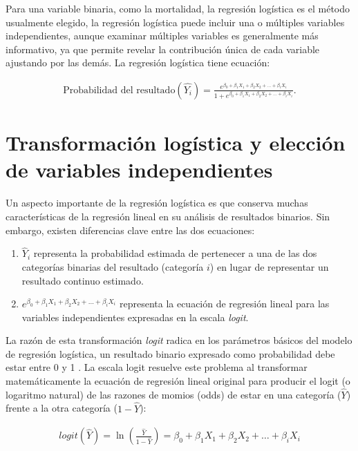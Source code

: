 \documentclass[12pt]{article}
\begin{document}
Para una variable binaria, como la mortalidad, la regresi\'on log\'istica es el m\'etodo usualmente elegido, la regresi\'on log\'istica puede incluir una o m\'ultiples variables independientes, aunque examinar m\'ultiples variables es generalmente m\'as informativo, ya que permite revelar la contribuci\'on \'unica de cada variable ajustando por las dem\'as. La regresi\'on log\'istica tiene ecuaci\'on:

\begin{eqnarray}
\textrm{Probabilidad del resultado}(\hat{Y_i}) = \frac{e^{\beta_0 + \beta_1 X_1 + \beta_2 X_2 + \ldots + \beta_i X_i}}{1 + e^{\beta_0 + \beta_1 X_1 + \beta_2 X_2 + \ldots + \beta_i X_i}}.
\end{eqnarray}


\section{Transformaci\'on log\'istica y elecci\'on de variables independientes}

Un aspecto importante de la regresi\'on log\'istica es que conserva muchas caracter\'isticas de la regresi\'on lineal en su an\'alisis de resultados binarios. Sin embargo, existen diferencias clave entre las dos ecuaciones:

\begin{enumerate}
  \item $\hat{Y}_i$ representa la probabilidad estimada de pertenecer a una de las dos categor\'ias binarias del resultado (categor\'ia $i$) en lugar de representar un resultado continuo estimado.
  
  \item $e^{\beta_0 + \beta_1 X_1 + \beta_2 X_2 + \ldots + \beta_i X_i}$ representa la ecuaci\'on de regresi\'on lineal para las variables independientes expresadas en la escala \textit{logit}.
\end{enumerate}

La raz\'on de esta transformaci\'on \textit{logit} radica en los par\'ametros b\'asicos del modelo de regresi\'on log\'istica, un resultado binario expresado como probabilidad debe estar entre 0 y 1 \cite{darlington1990}. La escala logit resuelve este problema al transformar matem\'aticamente la ecuaci\'on de regresi\'on lineal original para producir el logit (o logaritmo natural) de las razones de momios (odds) de estar en una categor\'ia ($\hat{Y}$) frente a la otra categor\'ia ($1 - \hat{Y}$):

\begin{eqnarray}
logit(\hat{Y})=\ln\left(\frac{\hat{Y}}{1 - \hat{Y}}\right) = \beta_0 + \beta_1 X_1 + \beta_2 X_2 + \ldots + \beta_i X_i
\end{eqnarray}
\end{document}
